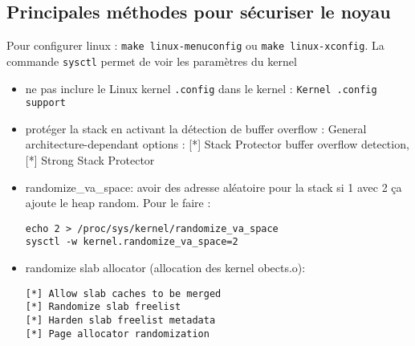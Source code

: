 \subsection{Principales méthodes pour sécuriser le noyau}
Pour configurer linux : \verb!make linux-menuconfig! ou \verb!make linux-xconfig!. La commande \verb!sysctl! permet de voir les paramètres du kernel
\begin{itemize}
\item ne pas inclure le Linux kernel \verb!.config! dans le kernel : \verb!Kernel .config support!
\item protéger la stack en activant la détection de buffer overflow : General architecture-dependant options : [*] Stack Protector buffer overflow detection, [*] Strong Stack Protector
\item randomize\_va\_space: avoir des adresse aléatoire pour la stack si 1 avec 2 ça ajoute le heap random. Pour le faire : \begin{Verbatim}[breaklines=true, breakanywhere=true]
echo 2 > /proc/sys/kernel/randomize_va_space
sysctl -w kernel.randomize_va_space=2
\end{Verbatim}
\item randomize slab allocator (allocation des kernel obects.o): 
\begin{Verbatim}[breaklines=true, breakanywhere=true]
[*] Allow slab caches to be merged
[*] Randomize slab freelist
[*] Harden slab freelist metadata
[*] Page allocator randomization
\end{Verbatim}


\end{itemize}
